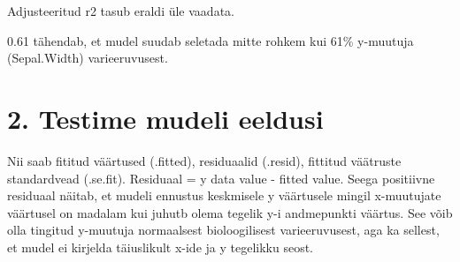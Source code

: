 \documentclass[]{book}
\newenvironment{Shaded}{\begin{snugshade}}{\end{snugshade}}
\newcommand{\KeywordTok}[1]{\textcolor[rgb]{0.13,0.29,0.53}{\textbf{#1}}}
\newcommand{\DataTypeTok}[1]{\textcolor[rgb]{0.13,0.29,0.53}{#1}}
\newcommand{\StringTok}[1]{\textcolor[rgb]{0.31,0.60,0.02}{#1}}
\newcommand{\CommentTok}[1]{\textcolor[rgb]{0.56,0.35,0.01}{\textit{#1}}}
\newcommand{\OperatorTok}[1]{\textcolor[rgb]{0.81,0.36,0.00}{\textbf{#1}}}
\newcommand{\NormalTok}[1]{#1}
\begin{document}
\begin{Shaded}
\end{Shaded}

Adjusteeritud r2 tasub eraldi üle vaadata.

\begin{Shaded}
\end{Shaded}

0.61 tähendab, et mudel suudab seletada mitte rohkem kui 61\% y-muutuja
(Sepal.Width) varieeruvusest.

\section*{2. Testime mudeli eeldusi}\label{testime-mudeli-eeldusi}

Nii saab fititud väärtused (.fitted), residuaalid (.resid), fittitud
väätruste standardvead (.se.fit). Residuaal = y data value - fitted
value. Seega positiivne residuaal näitab, et mudeli ennustus keskmisele
y väärtusele mingil x-muutujate väärtusel on madalam kui juhutb olema
tegelik y-i andmepunkti väärtus. See võib olla tingitud y-muutuja
normaalsest bioloogilisest varieeruvusest, aga ka sellest, et mudel ei
kirjelda täiuslikult x-ide ja y tegelikku seost.
\end{document}
